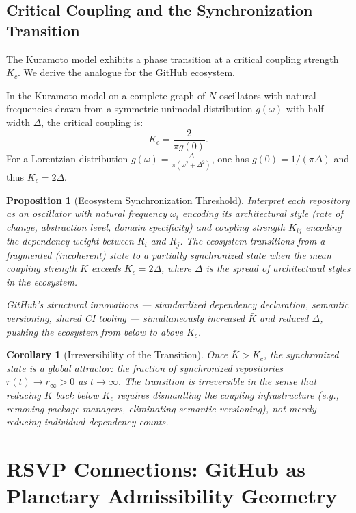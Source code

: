 \documentclass[11pt]{article}
\newtheorem{proposition}[theorem]{Proposition}
\newtheorem{corollary}[theorem]{Corollary}
\begin{document}
\subsection*{Critical Coupling and the Synchronization Transition}

The Kuramoto model exhibits a phase transition at a critical coupling strength
$K_c$. We derive the analogue for the GitHub ecosystem.

In the Kuramoto model on a complete graph of $N$ oscillators with natural
frequencies drawn from a symmetric unimodal distribution $g(\omega)$ with
half-width $\Delta$, the critical coupling is:
\[
K_c = \frac{2}{\pi g(0)}.
\]
For a Lorentzian distribution $g(\omega) = \frac{\Delta}{\pi(\omega^2 +
\Delta^2)}$, one has $g(0) = 1/(\pi\Delta)$ and thus $K_c = 2\Delta$.

\begin{proposition}[Ecosystem Synchronization Threshold]
Interpret each repository as an oscillator with natural frequency $\omega_i$
encoding its architectural style (rate of change, abstraction level, domain
specificity) and coupling strength $K_{ij}$ encoding the dependency weight
between $R_i$ and $R_j$. The ecosystem transitions from a fragmented
(incoherent) state to a partially synchronized state when the mean coupling
strength $\bar{K}$ exceeds $K_c = 2\Delta$, where $\Delta$ is the spread of
architectural styles in the ecosystem.

GitHub's structural innovations --- standardized dependency declaration,
semantic versioning, shared CI tooling --- simultaneously increased $\bar{K}$
and reduced $\Delta$, pushing the ecosystem from below to above $K_c$.
\end{proposition}

\begin{corollary}[Irreversibility of the Transition]
Once $\bar{K} > K_c$, the synchronized state is a global attractor: the
fraction of synchronized repositories $r(t) \to r_\infty > 0$ as $t \to
\infty$. The transition is irreversible in the sense that reducing $\bar{K}$
back below $K_c$ requires dismantling the coupling infrastructure (e.g.,
removing package managers, eliminating semantic versioning), not merely
reducing individual dependency counts.
\end{corollary}

\section{RSVP Connections: GitHub as Planetary Admissibility Geometry}
\end{document}
